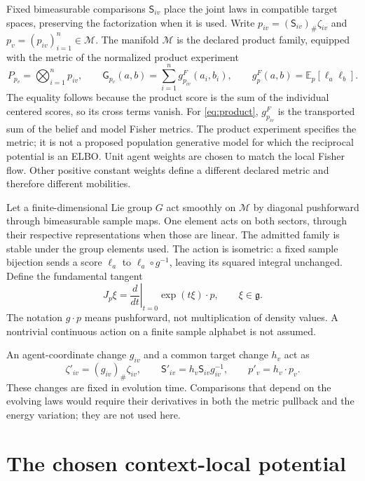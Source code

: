 \documentclass[11pt]{article}
\newcommand{\E}{\mathbb E}
\newcommand{\M}{\mathcal M}
\newcommand{\G}{\mathsf G}
\begin{document}
Fixed bimeasurable comparisons $\mathsf S_{iv}$ place the joint laws in compatible target spaces, preserving the factorization when it is used. Write $p_{iv}=(\mathsf S_{iv})_\#\zeta_{iv}$ and $p_v=(p_{iv})_{i=1}^n\in\M$. The manifold $\M$ is the declared product family, equipped with the metric of the normalized product experiment
\begin{equation}
 P_{p_v}=\bigotimes_{i=1}^n p_{iv},\qquad
 \G_{p_v}(a,b)=\sum_{i=1}^n g^F_{p_{iv}}(a_i,b_i),\qquad
 g^F_p(a,b)=\E_p[\ell_a\ell_b].
 \label{eq:fisher}
\end{equation}
The equality follows because the product score is the sum of the individual centered scores, so its cross terms vanish. For \eqref{eq:product}, $g^F_{p_{iv}}$ is the transported sum of the belief and model Fisher metrics. The product experiment specifies the metric; it is not a proposed population generative model for which the reciprocal potential is an ELBO. Unit agent weights are chosen to match the local Fisher flow. Other positive constant weights define a different declared metric and therefore different mobilities.

Let a finite-dimensional Lie group $G$ act smoothly on $\M$ by diagonal pushforward through bimeasurable sample maps. One element acts on both sectors, through their respective representations when those are linear. The admitted family is stable under the group elements used. The action is isometric: a fixed sample bijection sends a score $\ell_a$ to $\ell_a\circ g^{-1}$, leaving its squared integral unchanged. Define the fundamental tangent
\begin{equation}
 J_p\xi=\left.\frac{d}{dt}\right|_{t=0}\exp(t\xi)\cdot p,
 \qquad \xi\in\mathfrak g.
 \label{eq:J}
\end{equation}
The notation $g\cdot p$ means pushforward, not multiplication of density values. A nontrivial continuous action on a finite sample alphabet is not assumed.

An agent-coordinate change $g_{iv}$ and a common target change $h_v$ act as
\begin{equation}
 \zeta'_{iv}=(g_{iv})_\#\zeta_{iv},\qquad
 \mathsf S'_{iv}=h_v\mathsf S_{iv}g_{iv}^{-1},\qquad
 p'_v=h_v\cdot p_v.
 \label{eq:comparisons}
\end{equation}
These changes are fixed in evolution time. Comparisons that depend on the evolving laws would require their derivatives in both the metric pullback and the energy variation; they are not used here.

\section{The chosen context-local potential}
\end{document}
